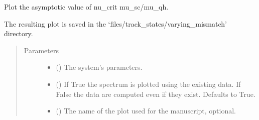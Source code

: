 \documentclass[letterpaper,10pt,english]{sphinxmanual}
\begin{document}
\begin{fulllineitems}
\label{\detokenize{modules:modules.utils.plot_nu_crit_limit_vs_mismatch}}
\pysigstartsignatures
{}
\pysigstopsignatures
\sphinxAtStartPar
Plot the asymptotic value of nu\_crit  mu\_sc/mu\_qh.

\sphinxAtStartPar
The resulting plot is saved in the ‘files/track\_states/varying\_mismatch’ directory.
\begin{quote}\begin{description}
\item[{Parameters}] \leavevmode\begin{itemize}
\item {} 
\sphinxAtStartPar
{} () \textendash{} The system’s parameters.

\item {} 
\sphinxAtStartPar
{} () \textendash{} If True the spectrum is plotted using the existing data.
If False the data are computed even if they exist. Defaults to True.

\item {} 
\sphinxAtStartPar
{} () \textendash{} The name of the plot used for the manuscript, optional.

\end{itemize}

\end{description}\end{quote}

\end{fulllineitems}

\end{document}
